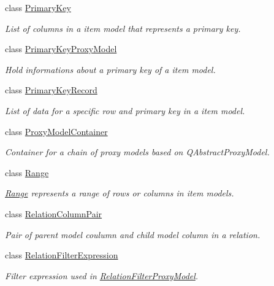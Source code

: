 \begin{DoxyCompactItemize}
class \hyperlink{class_mdt_1_1_item_model_1_1_primary_key}{Primary\+Key}
\begin{DoxyCompactList}\small\item\em List of columns in a item model that represents a primary key. \end{DoxyCompactList}\item 
class \hyperlink{class_mdt_1_1_item_model_1_1_primary_key_proxy_model}{Primary\+Key\+Proxy\+Model}
\begin{DoxyCompactList}\small\item\em Hold informations about a primary key of a item model. \end{DoxyCompactList}\item 
class \hyperlink{class_mdt_1_1_item_model_1_1_primary_key_record}{Primary\+Key\+Record}
\begin{DoxyCompactList}\small\item\em List of data for a specific row and primary key in a item model. \end{DoxyCompactList}\item 
class \hyperlink{class_mdt_1_1_item_model_1_1_proxy_model_container}{Proxy\+Model\+Container}
\begin{DoxyCompactList}\small\item\em Container for a chain of proxy models based on Q\+Abstract\+Proxy\+Model. \end{DoxyCompactList}\item 
class \hyperlink{class_mdt_1_1_item_model_1_1_range}{Range}
\begin{DoxyCompactList}\small\item\em \hyperlink{class_mdt_1_1_item_model_1_1_range}{Range} represents a range of rows or columns in item models. \end{DoxyCompactList}\item 
class \hyperlink{class_mdt_1_1_item_model_1_1_relation_column_pair}{Relation\+Column\+Pair}
\begin{DoxyCompactList}\small\item\em Pair of parent model coulumn and child model column in a relation. \end{DoxyCompactList}\item 
class \hyperlink{class_mdt_1_1_item_model_1_1_relation_filter_expression}{Relation\+Filter\+Expression}
\begin{DoxyCompactList}\small\item\em Filter expression used in \hyperlink{class_mdt_1_1_item_model_1_1_relation_filter_proxy_model}{Relation\+Filter\+Proxy\+Model}. \end{DoxyCompactList}\item 

\end{DoxyCompactItemize}
